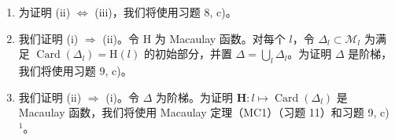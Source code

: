 \begin{enumerate}
\def\labelenumi{\alph{enumi})}
\item
  为证明 (ii) \(\Leftrightarrow\) (iii)，我们将使用习题 8, c)。
\item
  我们证明 (i) \(\Rightarrow\) (ii)。令 H 为 Macaulay 函数。对每个 \(l\)，令 \(\Delta_l \subset \mathcal{M}_l\) 为满足 \(\operatorname{Card}(\Delta_l) = \mathrm{H}(l)\) 的初始部分，并置 \(\Delta = \bigcup_{l} \Delta_l\)。为证明 \(\Delta\) 是阶梯，我们将使用习题 9, c)。
\item
  我们证明 (ii) \(\Rightarrow\) (i)。令 \(\Delta\) 为阶梯。为证明 \(\mathbf{H}: l \mapsto \operatorname{Card}(\Delta_l)\) 是 Macaulay 函数，我们将使用 Macaulay 定理（MC1）（习题 11）和习题 9, c) \(^{1}\)。
\end{enumerate}
